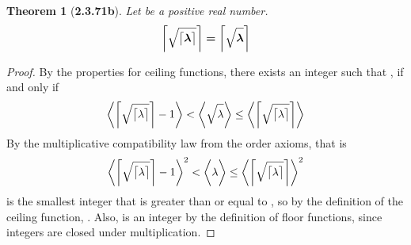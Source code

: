 \documentclass[a4paper, 12pt]{article}
\theoremstyle{plain}
\newtheorem*{theorem*}{Theorem}
\begin{document}
\begin{theorem*}[\textbf{2.3.71b}]
    Let \bm{$\lambda$} be a positive real number.
    \begin{equation*}
        \bm{
            \bigg \lceil 
                \sqrt{ \strut \big \lceil \lambda \big \rceil }
            \bigg \rceil 
                = 
            \bigg \lceil \sqrt{ \strut \lambda } \bigg \rceil
        }
    \end{equation*}
\end{theorem*}
\begin{proof}
    By the properties for ceiling functions,
    there exists an integer
    \bm{$\big \lceil \sqrt{ \lceil \lambda \rceil} \big \rceil$}
    such that
    \bm{$
        \big \lceil \sqrt{ \lambda } \big \rceil
            =
        \big \lceil \sqrt{ \lceil \lambda \rceil} \big \rceil$
    },
    if and only if
    \begin{equation*}
        \bigg \langle
            \bigg \lceil
                \sqrt{ \strut \big \lceil \lambda \big \rceil }
            \bigg \rceil
                -
            1
        \bigg \rangle
            <
        \bigg \langle
            \sqrt{ \strut \lambda }
        \bigg \rangle
            \leq
        \bigg \langle
            \bigg \lceil
                \sqrt{ \strut \big \lceil \lambda \big \rceil }
            \bigg \rceil
        \bigg \rangle
    \end{equation*}
    By the multiplicative compatibility law from the order axioms, that is
    \begin{equation*}
        \bigg \langle
            \bigg \lceil
                \sqrt{ \strut \big \lceil \lambda \big \rceil }
            \bigg \rceil
                -
            1
        \bigg \rangle
            ^2
            <
        \bigg \langle
            \lambda
        \bigg \rangle
            \leq
        \bigg \langle
            \bigg \lceil
                \sqrt{ \strut \big \lceil \lambda \big \rceil }
            \bigg \rceil
        \bigg \rangle
            ^2
    \end{equation*}
    \bm{$\big \lceil \lambda \big \rceil$} is the smallest integer that is greater than or equal to \bm{$\lambda$},
    so by the definition of the ceiling function, 
    \bm{$\lambda \leq \big \lceil \lambda \big \rceil$}.
    Also, 
    is an integer by the definition of floor functions,
    since integers are closed under multiplication.

\end{proof}
\end{document}
